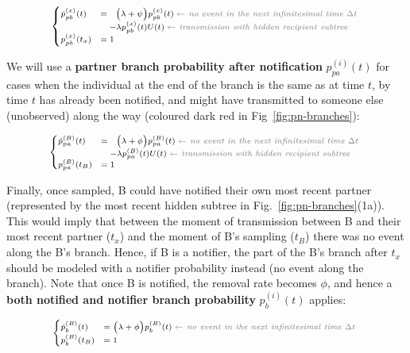 \documentclass[10pt,letterpaper]{article}
\begin{document}
\begin{equation}
\scriptsize
\begin{cases}
\dot{p}_{pb}^{(x)}(t) &=~~  \Big(\lambda + \psi\Big) p_{pb}^{(x)}(t)\; \textit{\color{gray} $\leftarrow$ no event in the next infinitesimal time $\Delta t$ }\\
    &~~~ - \lambda p_{pb}^{(x)}(t)U(t)\;  \textit{\color{gray} $\leftarrow$ transmission with hidden recipient subtree}\\
p_{pb}^{(x)}(t_x) &=  1\label{eq:p-o}
\end{cases}
\end{equation}

We will use a \textbf{partner branch probability after notification} $p_{pa}^{(i)}(t)$ for cases when the individual at the end of the branch is the same as at time $t$, by time $t$ has already been notified, and might have transmitted to someone else (unobserved) along the way (coloured dark red in Fig~\ref{fig:pn-branches}):

\begin{equation}
\scriptsize
\begin{cases}
\dot{p}_{pa}^{(B)}(t) &=~~  \Big(\lambda + \phi\Big) p_{pa}^{(B)}(t)\; \textit{\color{gray} $\leftarrow$ no event in the next infinitesimal time $\Delta t$ }\\
    &~~~ - \lambda p_{pa}^{(B)}(t)U(t)\;  \textit{\color{gray} $\leftarrow$ transmission with hidden recipient subtree}\\
p_{pa}^{(B)}(t_B) &=  1\label{eq:p-p}
\end{cases}
\end{equation}

Finally, once sampled, B could have notified their own most recent partner (represented by the most recent hidden subtree in Fig.~\ref{fig:pn-branches}(1a)). This would imply that between the moment of transmission between B and their most recent partner ($t_x$) and the moment of B's sampling ($t_B$) there was no event along the B's branch. Hence, if B is a notifier, the part of the B's branch after $t_x$ should be modeled with a notifier probability instead (no event along the branch). 
Note that once B is notified, the removal rate becomes $\phi$, and hence a \textbf{both notified and notifier branch probability} $p_b^{(i)}(t)$ applies:

\begin{equation}
\scriptsize
\begin{cases}
\dot{p}_b^{(B)}(t) &=  \Big(\lambda + \phi\Big) p_b^{(B)}(t)\; \textit{\color{gray} $\leftarrow$ no event in the next infinitesimal time $\Delta t$ }\\
p_b^{(B)}(t_B) &= 1\label{eq:p-b}
\end{cases}
\end{equation}
\end{document}
